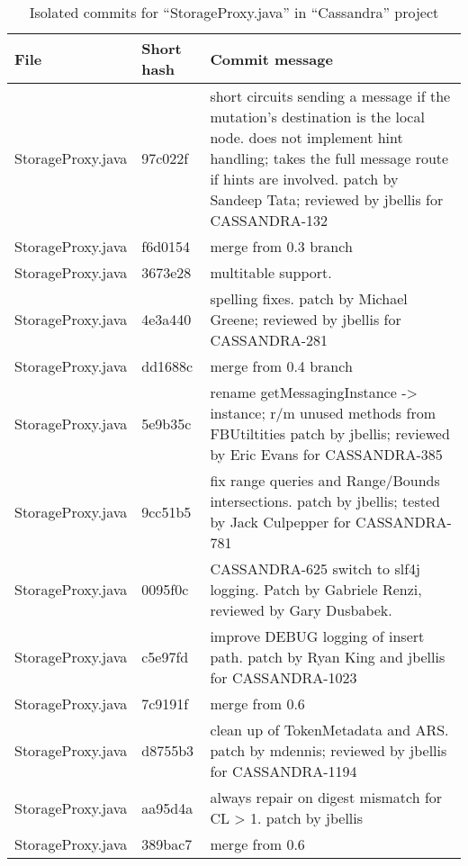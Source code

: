\begin{table*}[t]
\centering
\caption{Isolated commits for ``StorageProxy.java'' in ``Cassandra'' project}
\begin{tabular}{|p{3cm}|p{1.5cm}|p{8cm}|}
\hline
File & Short hash & Commit message\\\hline
StorageProxy.java&97c022f&short circuits sending a message if the mutation's destination is the local node.  does not implement hint handling; takes the full message route if hints are involved.  patch by Sandeep Tata; reviewed by jbellis for CASSANDRA-132 \\\hline
StorageProxy.java&f6d0154&merge from 0.3 branch \\\hline
StorageProxy.java&3673e28&multitable support. \\\hline
StorageProxy.java&4e3a440&spelling fixes.  patch by Michael Greene; reviewed by jbellis for CASSANDRA-281 \\\hline
StorageProxy.java&dd1688c&merge from 0.4 branch \\\hline
StorageProxy.java&5e9b35c&rename getMessagingInstance -> instance; r/m unused methods from FBUtiltities patch by jbellis; reviewed by Eric Evans for CASSANDRA-385 \\\hline
StorageProxy.java&9cc51b5&fix range queries and Range/Bounds intersections.  patch by jbellis; tested by Jack Culpepper for CASSANDRA-781 \\\hline
StorageProxy.java&0095f0c&CASSANDRA-625 switch to slf4j logging. Patch by Gabriele Renzi, reviewed by Gary Dusbabek. \\\hline
StorageProxy.java&c5e97fd&improve DEBUG logging of insert path.  patch by Ryan King and jbellis for CASSANDRA-1023 \\\hline
StorageProxy.java&7c9191f&merge from 0.6 \\\hline
StorageProxy.java&d8755b3&clean up of TokenMetadata and ARS.  patch by mdennis; reviewed by jbellis for CASSANDRA-1194 \\\hline
StorageProxy.java&aa95d4a&always repair on digest mismatch for CL > 1.  patch by jbellis \\\hline
StorageProxy.java&389bac7&merge from 0.6 \\\hline
\end{tabular}
\label{tab:StorageProxy-isolated-commits}
\end{table*}
